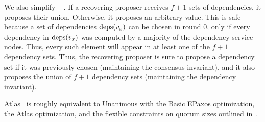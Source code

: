 We also simplify  -- . If a
recovering proposer receives $f+1$ sets of dependencies, it proposes their
union. Otherwise, it proposes an arbitrary value. This is safe because a set of
dependencies $\text{deps}(v_x)$ can be chosen in round $0$, only if every dependency
in $\text{deps}(v_x)$ was computed by a majority of the dependency service nodes.
Thus, every such element will appear in at least one of the $f+1$ dependency
sets. Thus, the recovering proposer is sure to propose a dependency set if it
was previously chosen (maintaining the consensus invariant), and it also
proposes the union of $f+1$ dependency sets (maintaining the dependency
invariant).

Atlas~\cite{enes2020state} is roughly equivalent to Unanimous \BPaxos{} with
the Basic EPaxos optimization, the Atlas optimization, and the flexible
constraints on quorum sizes outlined in~\cite{howard2021fast}.

